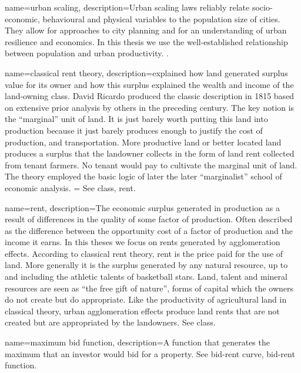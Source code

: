 {
name=urban scaling,
description={Urban scaling laws reliably relate socio-economic, behavioural and physical variables to the population size of cities. They allow for approaches  to city planning and for an understanding of urban resilience and economics. In this thesis we use the well-established relationship between population and urban productivity. \cite{doi:10.1098/rsif.2020.0705}}. %
}


{
name=classical rent theory,
description={explained how land generated surplus value for its owner and how this surplus explained the wealth and income of the land-owning class. David Ricardo produced the classic description in 1815 based on extensive prior analysis by others in the preceding century. The key notion is the ``marginal'' unit of land. It is just barely worth putting this land into production because it just barely produces enough to justify the cost of production, and transportation. More productive land or better located land produces a surplus that the landowner  collects in the form of land rent collected from tenant farmers. No tenant would pay to cultivate the  marginal unit of land. The theory employed the basic logic of later the later ``marginalist''  school of economic analysis. = See \gls{class}, \gls{rent}.}
}

{
name=rent,
description={The economic  surplus generated in production as a result of differences in the quality of some factor of production. Often described as the difference between the opportunity cost of a factor of production and the income it earns. In this theses we focus on rents generated by \glspl{agglomeration effect}. According to \gls{classical rent theory}, rent is the price paid for the use of land. More generally it is the  surplus generated by any natural resource, up to and including the athletic talents of basketball stars.\cite{lackmanClassicalBaseModern1976} Land, talent and mineral resources are seen as ``the free gift of nature'', forms of capital which the owners do not create but do appropriate. Like the productivity of agricultural land in classical theory,  urban \gls{agglomeration effect}s produce land rents that are not created but are appropriated by the landowners. See \gls{class}.}
}

{
name=maximum bid function,
description={A function that generates the maximum that an investor would bid for a property.  See \gls{bid-rent curve}, \gls{bid-rent function}.}
}

